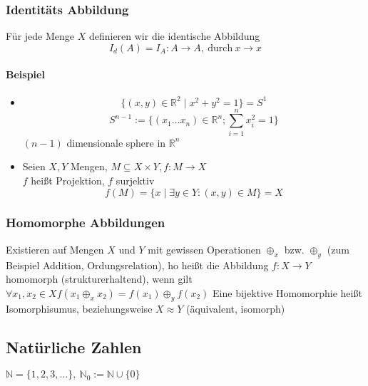 \documentclass[a4paper]{scrartcl}
\DeclareMathOperator{\Forall}{\forall}%
\begin{document}
\subsubsection{Identitäts Abbildung}
\label{sec-2-3-5}
Für jede Menge $X$ definieren wir die identische Abbildung \[I_d(A) = I_A: A\rightarrow A,~\text{durch}~x\rightarrow x\]
\paragraph{Beispiel}
\label{sec-2-3-5-1}
\begin{itemize}
\item \[\{(x,y)\in\mathbb{R}^2\mid x^2 + y^2 = 1\} = S^1\] \[S^{n-1} := \{(x_1 \ldots x_n) \in \mathbb{R}^n; \sum_{i = 1}^n x_i^2 = 1\}\] $(n - 1)$ dimensionale sphere in $\mathbb{R}^n$
\item Seien $X,Y$ Mengen, $M\subseteq X\times Y, f:M\rightarrow X$ \\ $f$ heißt Projektion, $f$ surjektiv \[f(M) = \{x\mid \exists y \in Y : (x,y) \in M\} = X\]
\end{itemize}
\subsubsection{Homomorphe Abbildungen}
\label{sec-2-3-6}
Existieren auf Mengen $X$ und $Y$ mit gewissen Operationen $\oplus_x$ bzw. $\oplus_y$ (zum Beispiel Addition, Ordungsrelation), ho heißt die Abbildung $f:X\to Y$ homomorph (strukturerhaltend), wenn gilt $\Forall x_1,x_2 \in X f(x_1\oplus_x x_2) = f(x_1)\oplus_y f(x_2)$
Eine bijektive Homomorphie heißt Isomorphisumus, beziehungsweise $X\approx Y$ (äquivalent, isomorph)
\subsection{Natürliche Zahlen}
\label{sec-2-4}
$\mathbb{N} = \{1,2,3,\ldots\},~\mathbb{N}_0 := \mathbb{N}\cup \{0\}$
\end{document}
